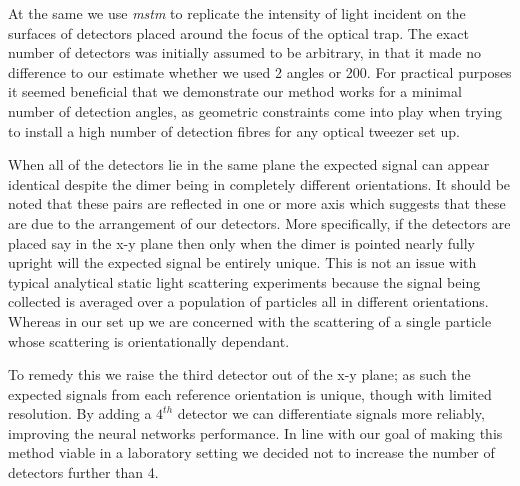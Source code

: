 At the same we use \textit{mstm} to replicate the intensity of light
incident on the surfaces of detectors placed around the focus of the
optical trap. The exact number of detectors was initially assumed to 
be arbitrary, in that it made no difference to our estimate whether 
we used 2 angles or 200. For practical purposes it seemed beneficial 
that we demonstrate our method works for a minimal number of detection 
angles, as geometric constraints come into play when trying to install 
a high number of detection fibres for any optical tweezer set up.

When all of the detectors lie in the same plane the expected signal 
can appear identical despite the dimer being in completely different orientations. It should be noted that these pairs are reflected in 
one or more axis which suggests that these are due to the arrangement 
of our detectors. More specifically, if the detectors are placed say 
in the x-y plane then only when the dimer is pointed nearly fully 
upright will the expected signal be entirely unique. This is not an 
issue with typical analytical static light scattering experiments 
because the signal being collected is averaged over a population of 
particles all in different orientations. Whereas in our set up we are concerned with the scattering of a single particle whose scattering is orientationally dependant. 

To remedy this we raise the third detector out of the x-y plane; 
as such the expected signals from each reference orientation is 
unique, though with limited resolution. By adding a $4^{th}$ 
detector we can differentiate signals more reliably, improving the 
neural networks performance. In line with our goal of making this 
method viable in a laboratory setting we decided not to increase 
the number of detectors further than 4. 

